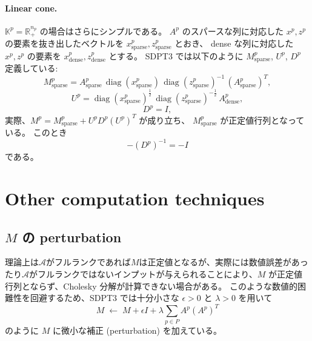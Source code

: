 \documentclass{jsarticle}
\begin{document}
\paragraph{Linear cone.}

$\mathbb{K}^p = \mathbb{R}^{n_p}_+$ の場合はさらにシンプルである。  
$A^p$ のスパースな列に対応した $x^p, z^p$ の要素を抜き出したベクトルを 
$x^p_{\mathrm{sparse}}, z^p_{\mathrm{sparse}}$ とおき、
dense な列に対応した $x^p, z^p$ の要素を 
$x^p_{\mathrm{dense}}, z^p_{\mathrm{dense}}$ とする。
SDPT3 では以下のように $M^p_{\mathrm{sparse}}$, $U^p$, $D^p$ 定義している:
\[
   M^p_{\mathrm{sparse}}
   = A^p_{\mathrm{sparse}}
     \,\operatorname{diag}(x^p_{\mathrm{sparse}})
     \,\operatorname{diag}(z^p_{\mathrm{sparse}})^{-1}
     \,(A^p_{\mathrm{sparse}})^T,
\]
\[
   U^p
   = \operatorname{diag}(x^p_{\mathrm{sparse}})^{\tfrac12}
     \,\operatorname{diag}(z^p_{\mathrm{sparse}})^{-\tfrac12}
     \,A^p_{\mathrm{dense}},
\]
\[ D^p = I, \]
実際、$M^p = M^p_{\mathrm{sparse}} + U^p D^p (U^p)^T$ が成り立ち、 $M^p_{\mathrm{sparse}}$ が正定値行列となっている。 
このとき 
\[-(D^p)^{-1} = -I\] 
である。

\medskip


\section{Other computation techniques}

\subsection{\boldmath $M$ の perturbation}

理論上は$\mathcal{A}$がフルランクであれば$M$は正定値となるが、実際には数値誤差があったり$\mathcal{A}$がフルランクではないインプットが与えられることにより、$M$ が正定値行列とならず、Cholesky 分解が計算できない場合がある。  
このような数値的困難性を回避するため、SDPT3 では十分小さな $\epsilon>0$ と $\lambda>0$ を用いて
\[
  M \;\leftarrow\; M + \epsilon I + \lambda \sum_{p\in P} A^p (A^p)^T
\]
のように $M$ に微小な補正 (perturbation) を加えている。
\end{document}
